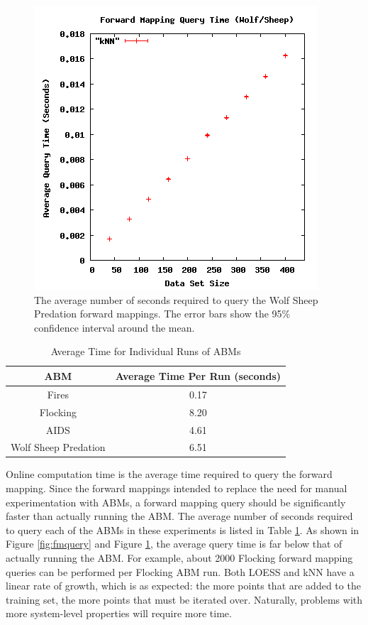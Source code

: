 \begin{figure}[ht]
\centering
\includegraphics[scale=.5]{images/results_wolfsheep/fm-query.png}
\caption{The average number of seconds required to query the Wolf Sheep Predation forward mappings.
The error bars show the 95\% confidence interval around the mean.}
\label{fig:wolfsheepfmquery}
\end{figure}


\begin{table}[ht]
  \caption{Average Time for Individual Runs of ABMs}
  \centering
  \begin{tabular}{c c}
    \hline \hline
    ABM & Average Time Per Run (seconds)\\
    \hline
    Fires & 0.17\\
    Flocking & 8.20\\
    AIDS & 4.61\\
    Wolf Sheep Predation & 6.51\\
    \hline
  \end{tabular}
  \label{table:runtimes}
\end{table}


Online computation time is the average time required to query the forward mapping.
Since the forward mappings intended to replace the need for manual experimentation with ABMs, a forward mapping query should be significantly faster than actually running the ABM.
The average number of seconds required to query each of the ABMs in these experiments is listed in Table \ref{table:runtimes}.
As shown in Figure \ref{fig:fmquery} and Figure \ref{fig:wolfsheepfmquery}, the average query time is far below that of actually running the ABM.
For example, about 2000 Flocking forward mapping queries can be performed per Flocking ABM run.
Both LOESS and kNN have a linear rate of growth, which is as expected: the more points that are added to the training set, the more points that must be iterated over.
Naturally, problems with more system-level properties will require more time.

